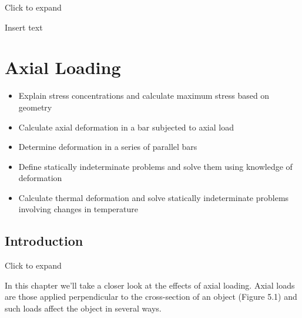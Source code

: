 \documentclass[
  letterpaper,
  DIV=11,
  numbers=noendperiod]{scrreprt}
\providecommand{\tightlist}{%
  \setlength{\itemsep}{0pt}\setlength{\parskip}{0pt}}\usepackage{longtable,booktabs,array}
\begin{document}
Click to expand

Insert text


\chapter{Axial Loading}\label{sec-axial-loading}

\begin{tcolorbox}[enhanced jigsaw, colbacktitle=quarto-callout-note-color!10!white, title={Learning Objectives}, coltitle=black, leftrule=.75mm, rightrule=.15mm, opacityback=0, breakable, colframe=quarto-callout-note-color-frame, left=2mm, arc=.35mm, colback=white, bottomrule=.15mm, bottomtitle=1mm, toptitle=1mm, titlerule=0mm, opacitybacktitle=0.6, toprule=.15mm]

\begin{itemize}
\tightlist
\item
  Explain stress concentrations and calculate maximum stress based on
  geometry
\item
  Calculate axial deformation in a bar subjected to axial load
\item
  Determine deformation in a series of parallel bars
\item
  Define statically indeterminate problems and solve them using
  knowledge of deformation
\item
  Calculate thermal deformation and solve statically indeterminate
  problems involving changes in temperature
\end{itemize}

\end{tcolorbox}

\section*{Introduction}\label{introduction-5}


Click to expand

In this chapter we'll take a closer look at the effects of axial
loading. Axial loads are those applied perpendicular to the
cross-section of an object (Figure 5.1) and such loads affect the object
in several ways.
\end{document}
